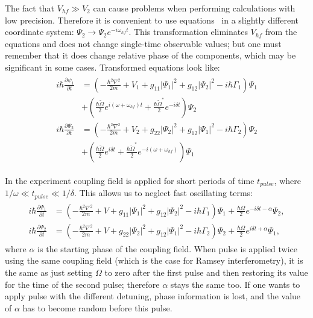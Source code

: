 The fact that $V_{hf} \gg V_2$ can cause problems when performing calculations with low precision.
Therefore it is convenient to use equations~
in a slightly different coordinate system:
$\Psi_2 \rightarrow \Psi_2 e^{-i \omega_{hf} t}$.
This transformation eliminates $V_{hf}$ from the equations and does not change single-time observable values;
but one must remember that it does change relative phase of the components,
which may be significant in some cases.
Transformed equations look like:
\begin{align*}
\begin{split}
	i \hbar \frac{\partial \psi_1}{\partial t} & = \left(
		-\frac{\hbar^2 \nabla^2}{2 m} + V_1
		+ g_{11} \lvert \Psi_1 \rvert^2
		+ g_{12} \lvert \Psi_2 \rvert^2
		- i \hbar \Gamma_1
	\right) \Psi_1 \\
	& + \left(
		\frac{\hbar \tilde{\Omega}}{2} e^{i (\omega + \omega_{hf}) t}
		+ \frac{\hbar \tilde{\Omega}^*}{2} e^{-i \delta t}
	\right) \Psi_2 \\
	i \hbar \frac{\partial \Psi_2}{\partial t} & = \left(
		-\frac{\hbar^2 \nabla^2}{2 m} + V_2
		+ g_{22} \lvert \Psi_2 \rvert^2
		+ g_{12} \lvert \Psi_1 \rvert^2
		- i \hbar \Gamma_2
	\right) \Psi_2 \\
	& + \left(
		\frac{\hbar \tilde{\Omega}}{2} e^{i \delta t}
		+ \frac{\hbar \tilde{\Omega}^*}{2} e^{-i (\omega + \omega_{hf})}
	\right) \Psi_1
\end{split}
\end{align*}

In the experiment coupling field is applied for short periods of time $t_{pulse}$,
where $1 / \omega \ll t_{pulse} \ll 1 / \delta$.
This allows us to neglect fast oscillating terms:
\begin{align}
\label{eqn:mean-field:cgpes_simplified}
\begin{split}
	i \hbar \frac{\partial \Psi_1}{\partial t} & = \left(
		-\frac{\hbar^2 \nabla^2}{2 m} + V
		+ g_{11} \lvert \Psi_1 \rvert^2
		+ g_{12} \lvert \Psi_2 \rvert^2
		- i \hbar \Gamma_1
	\right) \Psi_1
	+ \frac{\hbar \Omega}{2} e^{-i \delta t - \alpha} \Psi_2, \\
	i \hbar \frac{\partial \Psi_2}{\partial t} & = \left(
		-\frac{\hbar^2 \nabla^2}{2 m} + V
		+ g_{22} \lvert \Psi_2 \rvert^2
		+ g_{12} \lvert \Psi_1 \rvert^2
		- i \hbar \Gamma_2
	\right) \Psi_2 +
	\frac{\hbar \Omega}{2} e^{i \delta t + \alpha} \Psi_1,
\end{split}
\end{align}
where $\alpha$ is the starting phase of the coupling field.
When pulse is applied twice using the same coupling field (which is the case for Ramsey interferometry),
it is the same as just setting $\Omega$ to zero after the first pulse and then restoring its value for the time of the second pulse;
therefore $\alpha$ stays the same too.
If one wants to apply pulse with the different detuning, phase information is lost,
and the value of $\alpha$ has to become random before this pulse.


